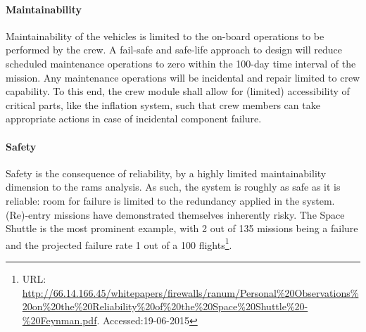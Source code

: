 \paragraph{Maintainability}
Maintainability of the vehicles is limited to the on-board operations to be performed by the crew. A fail-safe and safe-life approach to design will reduce scheduled maintenance operations to zero within the 100-day time interval of the mission. Any maintenance operations will be incidental and repair limited to crew capability. To this end, the crew module shall allow for (limited) accessibility of critical parts, like the inflation system, such that crew members can take appropriate actions in case of incidental component failure.

\paragraph{Safety}
Safety is the consequence of reliability, by a highly limited maintainability dimension to the \gls{rams} analysis. As such, the system is roughly as safe as it is reliable: room for failure is limited to the redundancy applied in the system. (Re)-entry missions have demonstrated themselves inherently risky. The Space Shuttle is the most prominent example, with 2 out of 135 missions being a failure and the projected failure rate 1 out of a 100 flights\footnote{URL: \url{http://66.14.166.45/whitepapers/firewalls/ranum/Personal\%20Observations\%20on\%20the\%20Reliability\%20of\%20the\%20Space\%20Shuttle\%20-\%20Feynman.pdf}. Accessed:19-06-2015}. 

